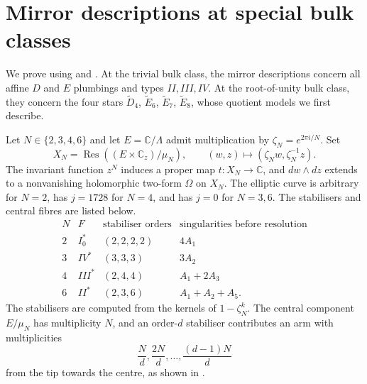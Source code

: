 \documentclass[a4paper]{amsart}
\newcommand{\C}{\mathbb{C}}
\DeclareMathOperator{\Res}{Res}
\numberwithin{equation}{section}
\begin{document}
\section{Mirror descriptions at special bulk classes}
\label{sec:star-consequences}

We prove  using
 and . At the trivial bulk
class, the mirror descriptions concern all affine $D$ and $E$
plumbings and types $II,III,IV$. At the root-of-unity bulk class,
they concern the four stars $\widetilde D_4$, $\widetilde E_6$,
$\widetilde E_7$, $\widetilde E_8$, whose quotient models we first
describe.

Let $N\in\{2,3,4,6\}$ and let $E=\C/\Lambda$ admit multiplication
by $\zeta_N=e^{2\pi i/N}$. Set
\[
 X_N=\Res((E\times\C_z)/\mu_N),\qquad
 (w,z)\longmapsto(\zeta_Nw,\zeta_N^{-1}z).
\]
The invariant function $z^N$ induces a proper map $t:X_N\to\C$,
and $dw\wedge dz$ extends to a nonvanishing holomorphic two-form
$\Omega$ on $X_N$. The elliptic curve is arbitrary for $N=2$,
has $j=1728$ for $N=4$, and has $j=0$ for $N=3,6$.
The stabilisers and central fibres are listed below.
\begin{equation}
\begin{array}{c|c|c|c}
 N&F&\text{stabiliser orders}&\text{singularities before resolution}\\ \hline
 2&I_0^*&(2,2,2,2)&4A_1\\
 3&IV^*&(3,3,3)&3A_2\\
 4&III^*&(2,4,4)&A_1+2A_3\\
 6&II^*&(2,3,6)&A_1+A_2+A_5.
\end{array}
\label{eq:geo-quotient-fibres}
\end{equation}
The stabilisers are computed from the kernels of $1-\zeta_N^k$.
The central component $E/\mu_N$ has multiplicity $N$, and an
order-$d$ stabiliser contributes an arm with multiplicities
\[
 \frac Nd,\frac{2N}d,\ldots,\frac{(d-1)N}d
\]
from the tip towards the centre, as shown in .
\end{document}
